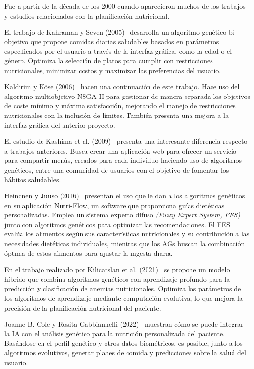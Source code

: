Fue a partir de la década de los 2000 cuando aparecieron muchos de los trabajos y estudios relacionados con la planificación nutricional.

El trabajo de Kahraman y Seven (2005)~\cite{kahraman2005} desarrolla un algoritmo genético bi-objetivo que propone comidas diarias saludables basados en parámetros especificados por el usuario a través de la interfaz gráfica, como la edad o el género. Optimiza la selección de platos para cumplir con restricciones nutricionales, minimizar costos y maximizar las preferencias del usuario.

Kaldirim y Köse (2006)~\cite{kaldirim2006} hacen una continuación de este trabajo. Hace uso del algoritmo multiobjetivo NSGA-II para gestionar de manera separada los objetivos de coste mínimo y máxima satisfacción, mejorando el manejo de restricciones nutricionales con la inclusión de límites. También presenta una mejora a la interfaz gráfica del anterior proyecto.

El estudio de Kashima et al. (2009)~\cite{kashima2009} presenta una interesante diferencia respecto a trabajos anteriores. Busca crear una aplicación web para ofrecer un servicio para compartir menús, creados para cada individuo haciendo uso de algoritmos genéticos, entre una comunidad de usuarios con el objetivo de fomentar los hábitos saludables.

Heinonen y Juuso (2016)~\cite{heinonen2016} presentan el uso que le dan a los algoritmos genéticos en su aplicación Nutri-Flow, un software que proporciona guías dietéticas personalizadas. Emplea un sistema experto difuso \textit{(Fuzzy Expert System, FES)} junto con algoritmos genéticos para optimizar las recomendaciones. El FES evalúa los alimentos según sus características nutricionales y su contribución a las necesidades dietéticas individuales, mientras que los AGs buscan la combinación óptima de estos alimentos para ajustar la ingesta diaria.

En el trabajo realizado por Kilicarslan et al. (2021)~\cite{KILICARSLAN2021102231} se propone un modelo híbrido que combina algoritmos genéticos con aprendizaje profundo para la predicción y clasificación de anemias nutricionales. Optimiza los parámetros de los algoritmos de aprendizaje mediante computación evolutiva, lo que mejora la precisión de la planificación nutricional del paciente.

Joanne B. Cole y Rosita Gabbiannelli (2022)~\cite{cole2022} muestran cómo se puede integrar la IA con el análisis genético para la nutrición personalizada del paciente. Basándose en el perfil genético y otros datos biométricos, es posible, junto a los algoritmos evolutivos, generar planes de comida y predicciones sobre la salud del usuario.





